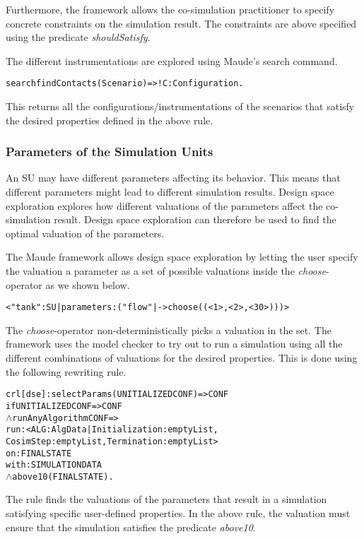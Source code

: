 Furthermore, the framework allows the co-simulation practitioner to specify concrete constraints on the simulation result.
The constraints are above specified using the predicate \emph{shouldSatisfy}.

The different instrumentations are explored using Maude's search command.

\begin{alltt}
  \small
  search findContacts(Scenario) =>! C:Configuration .
\end{alltt}
  
This returns all the configurations/instrumentations of the scenarios that satisfy the desired properties defined in the above rule.

\subsubsection{Parameters of the Simulation Units}
An SU may have different parameters affecting its behavior.
This means that different parameters might lead to different simulation results.
Design space exploration explores how different valuations of the parameters affect the co-simulation result.
Design space exploration can therefore be used to find the optimal valuation of the parameters. 

The Maude framework allows design space exploration by letting the user specify the valuation a parameter as a set of possible valuations inside the \emph{choose}-operator as we shown below.
\begin{alltt}
  \small
< "tank" : SU | parameters : ("flow" |-> choose((< 1 >,< 2 >,< 30 >))) >
\end{alltt}

The \emph{choose}-operator non-deterministically picks a valuation in the set.
The framework uses the model checker to try out to run a simulation using all the different combinations of valuations for the desired properties.
This is done using the following rewriting rule.

\begin{alltt}
  \small
  crl [dse] : selectParams(UNITIALIZEDCONF) => CONF 
  if UNITIALIZEDCONF => CONF
  \(\land\) runAnyAlgorithm CONF => 
      run: < ALG : AlgData | Initialization : emptyList, 
      CosimStep : emptyList, Termination : emptyList > 
      on: FINALSTATE
      with: SIMULATIONDATA
  \(\land\) above10(FINALSTATE) .
\end{alltt}

The rule finds the valuations of the parameters that result in a simulation satisfying specific user-defined properties.
In the above rule, the valuation must ensure that the simulation satisfies the predicate \emph{above10}.

